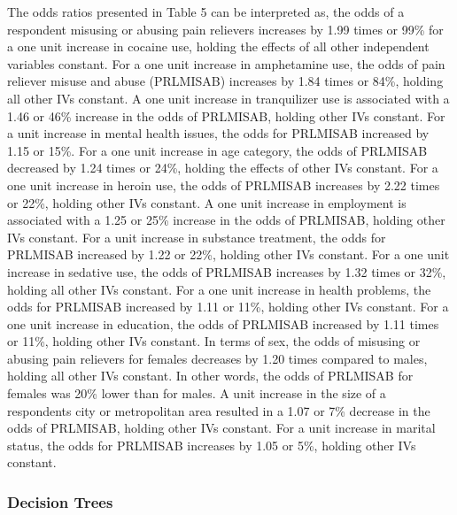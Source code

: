 \documentclass[sigconf]{acmart}
\begin{document}
The odds ratios presented in Table 5 can be interpreted as, the odds of a 
respondent misusing or abusing pain relievers increases by 1.99 times or 99\% 
for a one unit increase in cocaine use, holding the effects of all other 
independent variables constant. For a one unit increase in amphetamine use, 
the odds of pain reliever misuse and abuse (PRLMISAB) increases by 1.84 times
or 84\%, holding all other IVs constant. A one unit increase in tranquilizer 
use is associated with a 1.46 or 46\% increase in the odds of PRLMISAB, 
holding other IVs constant. For a unit increase in mental health issues, the
odds for PRLMISAB increased by 1.15 or 15\%. For a one unit increase in age 
category, the odds of PRLMISAB decreased by 1.24 times or 24\%, holding the 
effects of other IVs constant. For a one unit increase in heroin use, the odds 
of PRLMISAB increases by 2.22 times or 22\%, holding other IVs constant. A one 
unit increase in employment is associated with a 1.25 or 25\% increase in the 
odds of PRLMISAB, holding other IVs constant. For a unit increase in substance 
treatment, the odds for PRLMISAB increased by 1.22 or 22\%, holding other IVs 
constant. For a one unit increase in sedative use, the odds of PRLMISAB 
increases by 1.32 times or 32\%, holding all other IVs constant. For a one 
unit increase in health problems, the odds for PRLMISAB increased by 1.11 or
11\%, holding other IVs constant. For a one unit increase in education, the 
odds of PRLMISAB increased by 1.11 times or 11\%, holding other IVs constant. 
In terms of sex, the odds of misusing or abusing pain relievers for females 
decreases by 1.20 times compared to males, holding all other IVs constant. 
In other words, the odds of PRLMISAB for females was 20\% lower than for males. 
A unit increase in the size of a respondents city or metropolitan area 
resulted in a 1.07 or 7\% decrease in the odds of PRLMISAB, holding other 
IVs constant. For a unit increase in marital status, the odds for PRLMISAB 
increases by 1.05 or 5\%, holding other IVs constant. 
 

\subsubsection{Decision Trees} 
\end{document}
